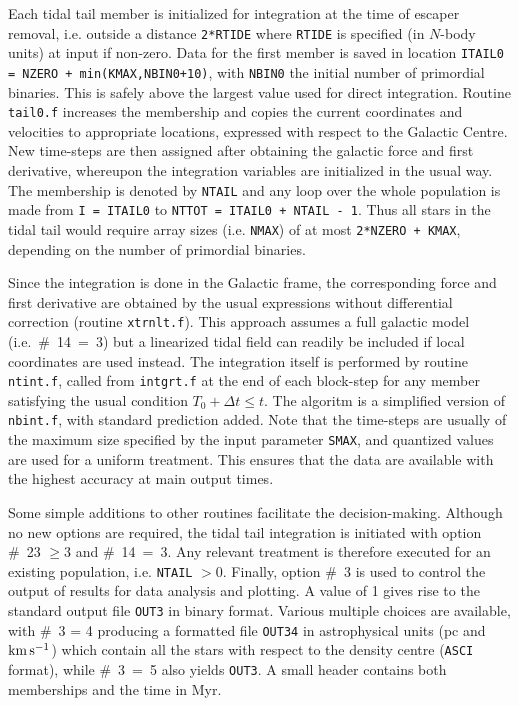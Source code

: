 \documentclass[12pt]{article}
\begin{document}
Each tidal tail member is initialized for integration at the time of
escaper removal, i.e. outside a distance {\tt 2*RTIDE} where {\tt RTIDE}
is specified (in $N$-body units) at input if non-zero.
Data for the first member is saved in location
{\tt ITAIL0 = NZERO + {\rm min}(KMAX,NBIN0+10)}, with {\tt NBIN0} the
initial number of primordial binaries.
This is safely above the largest value used for direct integration.
Routine {\tt tail0.f} increases the membership and copies the current
coordinates and velocities to appropriate locations, expressed with
respect to the Galactic Centre.
New time-steps are then assigned after obtaining the galactic force and
first derivative, whereupon the integration variables are initialized in
the usual way.
The membership is denoted by {\tt NTAIL} and any loop over the whole
population is made from {\tt I = ITAIL0} to
{\tt NTTOT = ITAIL0 + NTAIL - 1}.
Thus all stars in the tidal tail would require array sizes
(i.e. {\tt NMAX}) of at most {\tt 2*NZERO + KMAX}, depending on the number
of primordial binaries.

Since the integration is done in the Galactic frame, the corresponding
force and first derivative are obtained by the usual expressions without
differential correction (routine {\tt xtrnlt.f}).
This approach assumes a full galactic model (i.e.~\#~14~=~3) but a
linearized tidal field can readily be included if local coordinates are
used instead.
The integration itself is performed by routine {\tt ntint.f}, called from
{\tt intgrt.f} at the end of each block-step for any member satisfying
the usual condition $T_0 + \Delta t \le t$.
The algoritm is a simplified version of {\tt nbint.f}, with standard
prediction added.
Note that the time-steps are usually of the maximum size specified by the
input parameter {\tt SMAX}, and quantized values are used for a uniform
treatment.
This ensures that the data are available with the highest accuracy at main
output times.

Some simple additions to other routines facilitate the decision-making.
Although no new options are required, the tidal tail integration is
initiated with option \#~23 $\ge 3$ and \#~14~=~3.
Any relevant treatment is therefore executed for an existing population,
i.e. {\tt NTAIL} $> 0$.
Finally, option \#~3 is used to control the output of results for data
analysis and plotting.
A value of 1 gives rise to the standard output file {\tt OUT3} in binary
format.
Various multiple choices are available, with \#~3 = 4 producing a formatted
file {\tt OUT34} in astrophysical units (pc and ${\rm km}\,{\rm s}^{-1}$) which contain all
the stars with respect to the density centre ({\tt ASCI} format), while
\#~3~=~5 also yields {\tt OUT3}.
A small header contains both memberships and the time in Myr.
\end{document}
